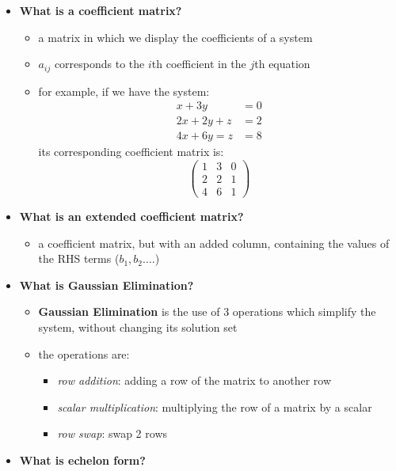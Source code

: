 \documentclass{exam}
\begin{document}
\begin{itemize}
    \item \textbf{What is a coefficient matrix?}
    \begin{itemize}
        \item a matrix in which we display the coefficients of a system
        \item $a_{ij}$ corresponds to the $i$th coefficient in the $j$th equation
        \item for example, if we have the system:
        \begin{align*}
            x + 3y &= 0 \\
            2x + 2y + z &= 2 \\
            4x + 6y = z &= 8
        \end{align*}
        its corresponding coefficient matrix is:
        \[
        \begin{pmatrix}
        1 & 3 & 0 \\
        2 & 2 & 1 \\
        4 & 6 & 1
        \end{pmatrix}
        \]
    \end{itemize}
    \item \textbf{What is an extended coefficient matrix?}
     \begin{itemize}
        \item a coefficient matrix, but with an added column, containing the values of the RHS terms ($b_1, b_2. \ldots$)
    \end{itemize}
    \item \textbf{What is Gaussian Elimination?}
     \begin{itemize}
        \item \textbf{Gaussian Elimination} is the use of 3 operations which simplify the system, without changing its solution set
        \item the operations are:
        \begin{itemize}
            \item \textit{row addition}: adding a row of the matrix to another row
            \item \textit{scalar multiplication}: multiplying the row of a matrix by a scalar
            \item \textit{row swap}: swap 2 rows
        \end{itemize}
    \end{itemize}
    \item \textbf{What is echelon form?}

\end{itemize}
\end{document}
